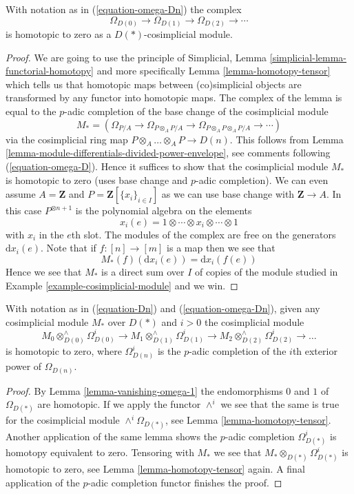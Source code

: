\begin{lemma}
\label{lemma-vanishing-omega-1}
With notation as in (\ref{equation-omega-Dn}) the complex
$$
\Omega_{D(0)} \to \Omega_{D(1)} \to \Omega_{D(2)} \to \cdots
$$
is homotopic to zero as a $D(*)$-cosimplicial module.
\end{lemma}

\begin{proof}
We are going to use the principle of
Simplicial, Lemma \ref{simplicial-lemma-functorial-homotopy}
and more specifically
Lemma \ref{lemma-homotopy-tensor}
which tells us that homotopic maps between (co)simplicial objects
are transformed by any functor into homotopic maps.
The complex of the lemma is equal to the $p$-adic completion of the
base change of the cosimplicial module
$$
M_* = \left(
\Omega_{P/A} \to
\Omega_{P \otimes_A P/A} \to
\Omega_{P \otimes_A P \otimes_A P/A} \to \cdots
\right)
$$
via the cosimplicial ring map $P\otimes_A \ldots \otimes_A P \to D(n)$. This
follows from Lemma \ref{lemma-module-differentials-divided-power-envelope},
see comments following (\ref{equation-omega-D}). Hence it
suffices to show that the cosimplicial module $M_*$ is homotopic to zero
(uses base change and $p$-adic completion).
We can even assume $A = \mathbf{Z}$ and $P = \mathbf{Z}[\{x_i\}_{i \in I}]$
as we can use base change with $\mathbf{Z} \to A$.
In this case $P^{\otimes n + 1}$ is the polynomial algebra on the elements
$$
x_i(e) = 1 \otimes \cdots \otimes x_i \otimes \cdots \otimes 1
$$
with $x_i$ in the $e$th slot. The modules of the complex are free on the
generators $\text{d}x_i(e)$. Note that if $f : [n] \to [m]$ is a
map then we see that
$$
M_*(f)(\text{d}x_i(e)) = \text{d}x_i(f(e))
$$
Hence we see that $M_*$ is a direct sum over $I$ of copies of the module
studied in Example \ref{example-cosimplicial-module} and we win.
\end{proof}

\begin{lemma}
\label{lemma-vanishing}
With notation as in (\ref{equation-Dn}) and (\ref{equation-omega-Dn}),
given any cosimplicial module $M_*$ over $D(*)$ and
$i > 0$ the cosimplicial module
$$
M_0 \otimes^\wedge_{D(0)} \Omega^i_{D(0)} \to
M_1 \otimes^\wedge_{D(1)} \Omega^i_{D(1)} \to
M_2 \otimes^\wedge_{D(2)} \Omega^i_{D(2)} \to \ldots
$$
is homotopic to zero, where $\Omega^i_{D(n)}$ is the $p$-adic completion
of the $i$th exterior power of $\Omega_{D(n)}$.
\end{lemma}

\begin{proof}
By Lemma \ref{lemma-vanishing-omega-1} the endomorphisms $0$ and $1$
of $\Omega_{D(*)}$ are homotopic.
If we apply the functor $\wedge^i$ we see that
the same is true for the cosimplicial module $\wedge^i\Omega_{D(*)}$, see
Lemma \ref{lemma-homotopy-tensor}.
Another application of the same lemma shows the $p$-adic completion
$\Omega^i_{D(*)}$ is homotopy equivalent to zero.
Tensoring with $M_*$ we see that $M_* \otimes_{D(*)} \Omega^i_{D(*)}$
is homotopic to zero, see Lemma \ref{lemma-homotopy-tensor} again.
A final application of the $p$-adic completion functor finishes the proof.
\end{proof}



